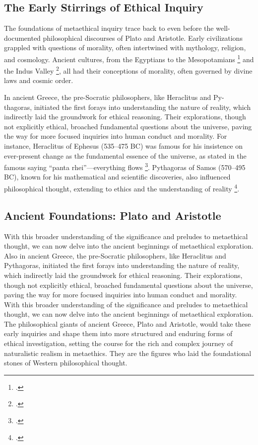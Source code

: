 \documentclass[12pt,a4paper]{article}
\begin{document}
\subsection{The Early Stirrings of Ethical Inquiry}
The foundations of metaethical inquiry trace back to even before the well-documented philosophical discourses of Plato and Aristotle. Early civilizations grappled with questions of morality, often intertwined with mythology, religion, and cosmology. Ancient cultures, from the Egyptians to the Mesopotamians \footcite{Frankfort1948} and the Indus Valley \footcite{Dales1962}, all had their conceptions of morality, often governed by divine laws and cosmic order.

In ancient Greece, the pre-Socratic philosophers, like Heraclitus and Py- thagoras, initiated the first forays into understanding the nature of reality, which indirectly laid the groundwork for ethical reasoning. Their explorations, though not explicitly ethical, broached fundamental questions about the universe, paving the way for more focused inquiries into human conduct and morality. For instance, Heraclitus of Ephesus (535–475 BC) was famous for his insistence on ever-present change as the fundamental essence of the universe, as stated in the famous saying “panta rhei”—everything flows \footcite{Hessel2018}. Pythagoras of Samos (570–495 BC), known for his mathematical and scientific discoveries, also influenced philosophical thought, extending to ethics and the understanding of reality \footcite{Lambek1981}.


\subsection{Ancient Foundations: Plato and Aristotle}
With this broader understanding of the significance and preludes to metaethical thought, we can now delve into the ancient beginnings of metaethical exploration. Also in ancient Greece, the pre-Socratic philosophers, like Heraclitus and Pythagoras, initiated the first forays into understanding the nature of reality, which indirectly laid the groundwork for ethical reasoning. Their explorations, though not explicitly ethical, broached fundamental questions about the universe, paving the way for more focused inquiries into human conduct and morality. With this broader understanding of the significance and preludes to metaethical thought, we can now delve into the ancient beginnings of metaethical exploration. The philosophical giants of ancient Greece, Plato and Aristotle, would take these early inquiries and shape them into more structured and enduring forms of ethical investigation, setting the course for the rich and complex journey of naturalistic realism in metaethics. They are the figures who laid the foundational stones of Western philosophical thought. 
\end{document}

